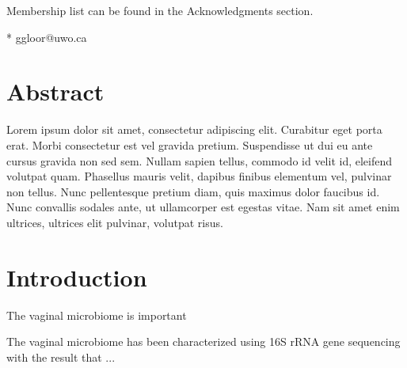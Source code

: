 \documentclass[10pt,letterpaper]{article}
\begin{document}
\begin{flushleft}



\textpilcrow Membership list can be found in the Acknowledgments section.

* ggloor@uwo.ca

\end{flushleft}
\section*{Abstract}
Lorem ipsum dolor sit amet, consectetur adipiscing elit. Curabitur eget porta erat. Morbi consectetur est vel gravida pretium. Suspendisse ut dui eu ante cursus gravida non sed sem. Nullam sapien tellus, commodo id velit id, eleifend volutpat quam. Phasellus mauris velit, dapibus finibus elementum vel, pulvinar non tellus. Nunc pellentesque pretium diam, quis maximus dolor faucibus id. Nunc convallis sodales ante, ut ullamcorper est egestas vitae. Nam sit amet enim ultrices, ultrices elit pulvinar, volutpat risus.


\linenumbers

\section*{Introduction}
The vaginal microbiome is important

The vaginal microbiome has been characterized using 16S rRNA gene sequencing with the result that ...
\end{document}
